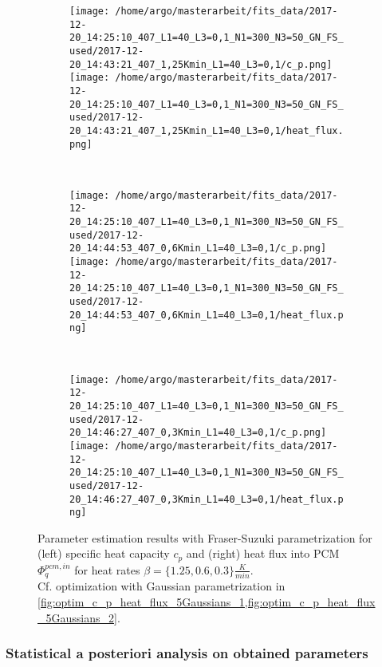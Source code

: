 \documentclass{scrartcl}[12pt, halfparskip]
\numberwithin{equation}{section}
\numberwithin{figure}{section}
\numberwithin{table}{section}
\begin{document}
\begin{figure}[H]
	\begin{subfigure}{1.\textwidth}
		\texttt{[image: /home/argo/masterarbeit/fits\_data/2017-12-20\_14:25:10\_407\_L1=40\_L3=0,1\_N1=300\_N3=50\_GN\_FS\_used/2017-12-20\_14:43:21\_407\_1,25Kmin\_L1=40\_L3=0,1/c\_p.png]}
		\texttt{[image: /home/argo/masterarbeit/fits\_data/2017-12-20\_14:25:10\_407\_L1=40\_L3=0,1\_N1=300\_N3=50\_GN\_FS\_used/2017-12-20\_14:43:21\_407\_1,25Kmin\_L1=40\_L3=0,1/heat\_flux.png]}
	\end{subfigure} \\[1ex]
	
	\begin{subfigure}{1.\textwidth}
		\texttt{[image: /home/argo/masterarbeit/fits\_data/2017-12-20\_14:25:10\_407\_L1=40\_L3=0,1\_N1=300\_N3=50\_GN\_FS\_used/2017-12-20\_14:44:53\_407\_0,6Kmin\_L1=40\_L3=0,1/c\_p.png]}
		\texttt{[image: /home/argo/masterarbeit/fits\_data/2017-12-20\_14:25:10\_407\_L1=40\_L3=0,1\_N1=300\_N3=50\_GN\_FS\_used/2017-12-20\_14:44:53\_407\_0,6Kmin\_L1=40\_L3=0,1/heat\_flux.png]}
	\end{subfigure} \\[1ex]
	
	\begin{subfigure}{1.\textwidth}
		\texttt{[image: /home/argo/masterarbeit/fits\_data/2017-12-20\_14:25:10\_407\_L1=40\_L3=0,1\_N1=300\_N3=50\_GN\_FS\_used/2017-12-20\_14:46:27\_407\_0,3Kmin\_L1=40\_L3=0,1/c\_p.png]}
		\texttt{[image: /home/argo/masterarbeit/fits\_data/2017-12-20\_14:25:10\_407\_L1=40\_L3=0,1\_N1=300\_N3=50\_GN\_FS\_used/2017-12-20\_14:46:27\_407\_0,3Kmin\_L1=40\_L3=0,1/heat\_flux.png]}
	\end{subfigure}
	\caption{Parameter estimation results with Fraser-Suzuki parametrization for (left) specific heat capacity $c_p$ and (right) heat flux into PCM $\varPhi_q^{pcm,in}$ for heat rates $\beta=\{ 1.25, 0.6, 0.3 \} \frac{K}{min}$. \\
	Cf. optimization with Gaussian parametrization in \cref{fig:optim_c_p_heat_flux_5Gaussians_1,fig:optim_c_p_heat_flux_5Gaussians_2}.}
	\label{fig:optim_c_p_heat_flux_FS_2}
\end{figure}

\subsubsection{Statistical a posteriori analysis on obtained parameters}
\end{document}
